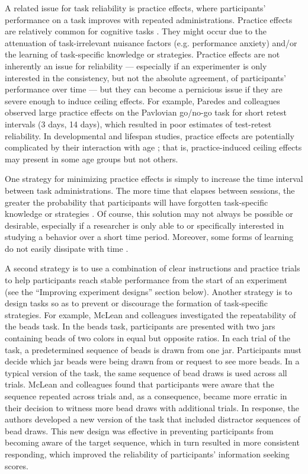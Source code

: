 \documentclass[a4paper,12pt]{article}
\begin{document}
A related issue for task reliability is practice effects, where participants' performance on a task improves with repeated administrations. Practice effects are relatively common for cognitive tasks \cite{hausknecht2007retesting, scharfen2018retest}. They might occur due to the attenuation of task-irrelevant nuisance factors (e.g. performance anxiety) and/or the learning of task-specific knowledge or strategies. Practice effects are not inherently an issue for reliability --- especially if an experimenter is only interested in the consistency, but not the absolute agreement, of participants' performance over time --- but they can become a pernicious issue if they are severe enough to induce ceiling effects. For example, Paredes and colleagues \cite{paredes2021psychometric} observed large practice effects on the Pavlovian go/no-go task for short retest intervals (3 days, 14 days), which resulted in poor estimates of test-retest reliability. In developmental and lifespan studies, practice effects are potentially complicated by their interaction with age \cite{anokhin2022age, salthouse2010influence}; that is, practice-induced ceiling effects may present in some age groups but not others. 

One strategy for minimizing practice effects is simply to increase the time interval between task administrations. The more time that elapses between sessions, the greater the probability that participants will have forgotten task-specific knowledge or strategies \cite{hausknecht2007retesting, scharfen2018retest}. Of course, this solution may not always be possible or desirable, especially if a researcher is only able to or specifically interested in studying a behavior over a short time period. Moreover, some forms of learning do not easily dissipate with time \cite{schiller2010preventing}.

A second strategy is to use a combination of clear instructions and practice trials to help participants reach stable performance from the start of an experiment (see the ``Improving experiment designs'' section below). Another strategy is to design tasks so as to prevent or discourage the formation of task-specific strategies. For example, McLean and colleagues \cite{mclean2018towards} investigated the repeatability of the beads task. In the beads task, participants are presented with two jars containing beads of two colors in equal but opposite ratios. In each trial of the task, a predetermined sequence of beads is drawn from one jar. Participants must decide which jar beads were being drawn from or request to see more beads. In a typical version of the task, the same sequence of bead draws is used across all trials. McLean and colleagues found that participants were aware that the sequence repeated across trials and, as a consequence, became more erratic in their decision to witness more bead draws with additional trials. In response, the authors developed a new version of the task that included distractor sequences of bead draws. This new design was effective in preventing participants from becoming aware of the target sequence, which in turn resulted in more consistent responding, which improved the reliability of participants' information seeking scores. 
\end{document}
